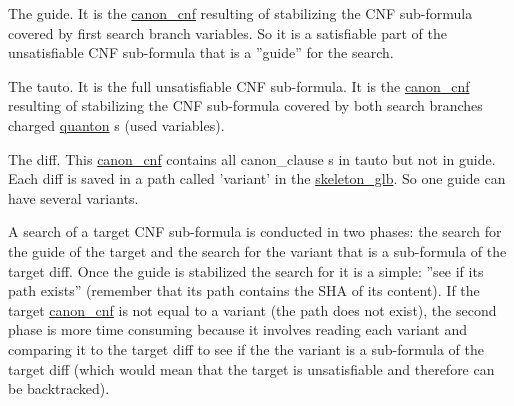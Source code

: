 \begin{DoxyItemize}
\item The guide. It is the \hyperlink{classcanon__cnf}{canon\+\_\+cnf} resulting of stabilizing the C\+N\+F sub-\/formula covered by first search branch variables. So it is a satisfiable part of the unsatisfiable C\+N\+F sub-\/formula that is a ''guide'' for the search.


\item The tauto. It is the full unsatisfiable C\+N\+F sub-\/formula. It is the \hyperlink{classcanon__cnf}{canon\+\_\+cnf} resulting of stabilizing the C\+N\+F sub-\/formula covered by both search branches charged \hyperlink{classquanton}{quanton} s (used variables).


\item The diff. This \hyperlink{classcanon__cnf}{canon\+\_\+cnf} contains all canon\+\_\+clause s in tauto but not in guide. Each diff is saved in a path called 'variant' in the \hyperlink{classskeleton__glb}{skeleton\+\_\+glb}. So one guide can have several variants. 
\end{DoxyItemize}

A search of a target C\+N\+F sub-\/formula is conducted in two phases\+: the search for the guide of the target and the search for the variant that is a sub-\/formula of the target diff. Once the guide is stabilized the search for it is a simple\+: ''see if its path exists'' (remember that its path contains the S\+H\+A of its content). If the target \hyperlink{classcanon__cnf}{canon\+\_\+cnf} is not equal to a variant (the path does not exist), the second phase is more time consuming because it involves reading each variant and comparing it to the target diff to see if the the variant is a sub-\/formula of the target diff (which would mean that the target is unsatisfiable and therefore can be backtracked). 